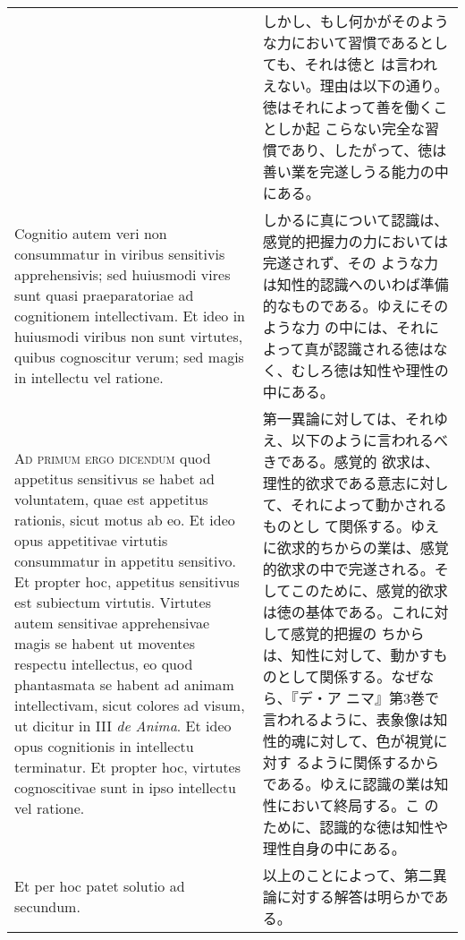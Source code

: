 \documentclass[10pt]{jsarticle}
\begin{document}
\begin{longtable}{p{21em}p{21em}}
 &

 しかし、もし何かがそのような力において習慣であるとしても、それは徳と
 は言われえない。理由は以下の通り。徳はそれによって善を働くことしか起
 こらない完全な習慣であり、したがって、徳は善い業を完遂しうる能力の中
 にある。

 
 \\

 Cognitio autem veri non consummatur in
 viribus sensitivis apprehensivis; sed huiusmodi vires sunt quasi
 praeparatoriae ad cognitionem intellectivam. Et ideo in huiusmodi
 viribus non sunt virtutes, quibus cognoscitur verum; sed magis in
 intellectu vel ratione.

&

 しかるに真について認識は、感覚的把握力の力においては完遂されず、その
 ような力は知性的認識へのいわば準備的なものである。ゆえにそのような力
 の中には、それによって真が認識される徳はなく、むしろ徳は知性や理性の
 中にある。

 \\

{\scshape Ad primum ergo dicendum} quod appetitus sensitivus se habet
ad voluntatem, quae est appetitus rationis, sicut motus ab eo. Et ideo
opus appetitivae virtutis consummatur in appetitu sensitivo. Et
propter hoc, appetitus sensitivus est subiectum virtutis. Virtutes
autem sensitivae apprehensivae magis se habent ut moventes respectu
intellectus, eo quod phantasmata se habent ad animam intellectivam,
sicut colores ad visum, ut dicitur in III {\itshape de Anima}. Et ideo
opus cognitionis in intellectu terminatur. Et propter hoc, virtutes
cognoscitivae sunt in ipso intellectu vel ratione.

&

 第一異論に対しては、それゆえ、以下のように言われるべきである。感覚的
 欲求は、理性的欲求である意志に対して、それによって動かされるものとし
 て関係する。ゆえに欲求的ちからの業は、感覚的欲求の中で完遂される。そ
 してこのために、感覚的欲求は徳の基体である。これに対して感覚的把握の
 ちからは、知性に対して、動かすものとして関係する。なぜなら、『デ・ア
 ニマ』第3巻で言われるように、表象像は知性的魂に対して、色が視覚に対す
 るように関係するからである。ゆえに認識の業は知性において終局する。こ
 のために、認識的な徳は知性や理性自身の中にある。
 
\\

Et per hoc patet solutio ad secundum.

&

以上のことによって、第二異論に対する解答は明らかである。
 

\end{longtable}
\end{document}
